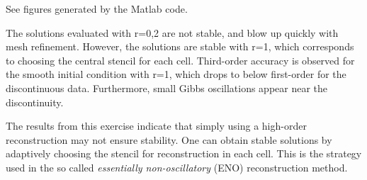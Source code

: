 \documentclass{article}
\begin{document}
\begin{exerciseList}
\item
See figures generated by the Matlab code.

The solutions evaluated with r=0,2 are not stable, and blow up quickly with mesh refinement. However, the solutions are stable with r=1, which corresponds to choosing the central stencil for each cell. Third-order accuracy is observed for the smooth initial condition with r=1, which drops to below first-order for the discontinuous data. Furthermore, small Gibbs oscillations appear near the discontinuity.

The results from this exercise indicate that simply using a high-order reconstruction may not ensure stability. One can obtain stable solutions by adaptively choosing the stencil for reconstruction in each cell. This is the strategy used in the so called \textit{essentially non-oscillatory} (ENO) reconstruction method.


\end{exerciseList}


\newpage







\end{document}
